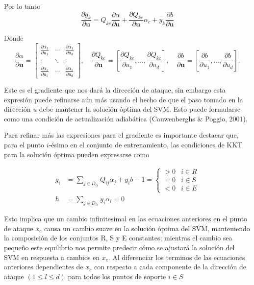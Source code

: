 \documentclass[letterpaper,12pt,oneside]{book}
\begin{document}
{{{{    Por lo tanto 
    \begin{equation}
        \frac{\partial g_k}{\partial \mathbf{u}} =Q_{ks} \frac{\partial \alpha}{\partial \mathbf{u}} + \frac{\partial Q_{kc}}{\partial \mathbf{u}} \alpha_c + y_k \frac{\partial b}{\partial \mathbf{u}} \label{eq: 4.2}
    \end{equation}
    
Donde 
\[
\frac{\partial \alpha}{\partial \mathbf{u}} = 
\begin{bmatrix}
\frac{\partial \alpha_1}{\partial u_1} & \cdots & \frac{\partial \alpha_1}{\partial u_d} \\
\vdots & \ddots & \vdots \\
\frac{\partial \alpha_s}{\partial u_1} & \cdots & \frac{\partial \alpha_s}{\partial u_d}
\end{bmatrix}, \quad
\frac{\partial Q_{kc}}{\partial \mathbf{u}} =
\left[ \frac{\partial Q_{kc}}{\partial u_1},  \dots, \frac{\partial Q_{kc}}{\partial u_d} \right], \quad
\frac{\partial b}{\partial \mathbf{u}} =
\left[ \frac{\partial b}{\partial u_1},  \dots, \frac{\partial b}{\partial u_d} \right].
\]

    
    
    
    
    
Este es el gradiente que nos dará la dirección de ataque, sin embargo esta expresión puede refinarse aún más usando el hecho de que el paso tomado en la dirección \(u\) debe mantener la solución óptima del SVM. Esto puede formularse como una condición de actualización adiabática (Cauwenberghs \& Poggio, 2001).

Para refinar más las expresiones para el gradiente es importante destacar que, para el punto \(i\)-ésimo en el conjunto de entrenamiento, las condiciones de KKT para la solución óptima pueden expresarse como

    \begin{align}
        g_i&=\sum_{j \in D_{tr}} Q_{ij}\alpha_j + y_i b -1=
            \begin{cases} 
             >0 & i \in R \\
             =0 & i \in S \\
             <0 & i \in E 
            \end{cases} \\
        h &=\sum_{j \in D_{tr}} y_i \alpha_i = 0
    \end{align}    
    
    Esto implica que un cambio infinitesimal en las ecuaciones anteriores en el punto de ataque $x_c$ causa un cambio suave en la solución óptima del SVM, manteniendo la composición de los conjuntos R, S y E constantes; mientras el cambio sea pequeño este equilibrio nos permite predecir cómo se ajustará la solución del SVM en respuesta a cambios en $x_c$. Al diferenciar los terminos de las ecuaciones anteriores dependientes de $x_c$ con respecto a cada componente de la dirección de ataque $(1 \leq l \leq d )$ para todos los puntos de soporte $i \in S$ 
    
}}}}
\end{document}

